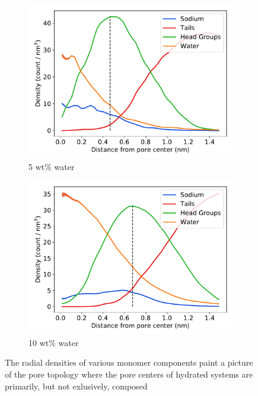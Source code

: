 \documentclass[journal=jpcbfk,manuscript=article]{achemso}
\begin{document}
\begin{figure}[!htb]
\begin{subfigure}{0.45\textwidth}
  \includegraphics[width=\textwidth]{component_density_5wt.pdf}
  \caption{5 wt\% water}\label{fig:component_density_5wt}
  \end{subfigure}
  \begin{subfigure}{0.45\textwidth}
  \includegraphics[width=\textwidth]{component_density_10wt.pdf}
  \caption{10 wt\% water}\label{fig:component_density_10wt}
  \end{subfigure}
  \caption{The radial densities of various monomer components paint a 
  picture of the pore topology where the pore centers of hydrated systems are primarily,
  but not exlusively,
 composed
}
\end{figure}
\end{document}
